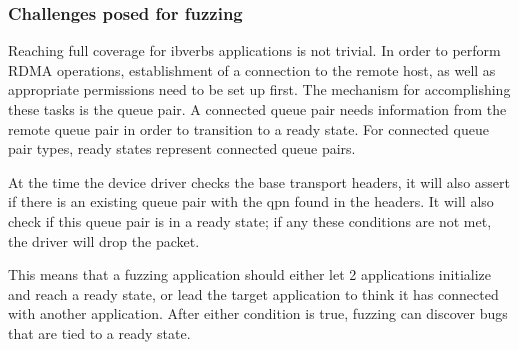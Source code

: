 \subsubsection{Challenges posed for fuzzing}\label{s:ibverbs-challenges}

Reaching full coverage for ibverbs applications is not trivial. In order to perform RDMA operations, establishment of
a connection to the remote host, as well as appropriate permissions need to be set up first. The mechanism for accomplishing
these tasks is the queue pair\cite{rdmamanual}. A connected queue pair
needs information from the remote queue pair in order to transition to a ready state.
For connected queue pair types, ready states represent connected queue pairs.

At the time the device driver checks the base transport headers, it will also assert if there is an existing queue pair
with the qpn found in the headers. It will also check if this queue pair is in a ready state; if any these conditions
are not met, the driver will drop the packet.

This means that a fuzzing application should either let 2 applications initialize and reach a ready state,
or lead the target application to think it has connected with another application. After either condition is true,
fuzzing can discover bugs that are tied to a ready state.











